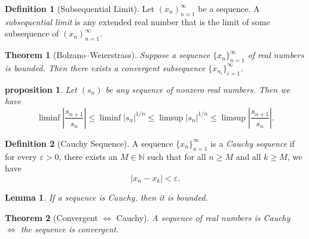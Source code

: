 \documentclass{article}
\newtheorem{theorem}{Theorem}[section]
\newtheorem{lemma}{Lemma}[section]
\newtheorem{proposition}{Proposition}[section]
\newtheorem{proposition}{proposition}[section]
\theoremstyle{definition}
\newtheorem{definition}{Definition}[section]
\theoremstyle{remark}
\begin{document}
\begin{definition}[Subsequential Limit]
Let  $ (x_n)^\infty_{n=1}$ be a sequence. A \textit{subsequential limit} is any extended real number that is the limit of some subsequence of  $ (x_n)^\infty_{n=1}$.

\end{definition}






\begin{theorem}[Bolzano–Weierstrass] \label{thm: Bolzano-Weierstrass}
Suppose a sequence \( \{x_n\}_{n=1}^{\infty} \) of real numbers is bounded. Then there exists a convergent subsequence \( \{x_{n_i}\}_{i=1}^{\infty} \).
\end{theorem}



\begin{proposition}
Let $(s_n)$ be any sequence of nonzero real numbers. Then we have
\[
\liminf \left| \frac{s_{n+1}}{s_n} \right| 
\leq \liminf |s_n|^{1/n} 
\leq \limsup |s_n|^{1/n} 
\leq \limsup \left| \frac{s_{n+1}}{s_n} \right|.
\]

\end{proposition}









\begin{definition}[Cauchy Sequence]\label{def:cauchy_sequence}
A sequence \( \{x_n\}_{n=1}^{\infty} \) is a \textit{Cauchy sequence} if for every \( \varepsilon > 0 \), there exists an \( M \in \mathbb{N} \) such that for all \( n \geq M \) and all \( k \geq M \), we have
\[
|x_n - x_k| < \varepsilon.
\]
\end{definition}







\begin{lemma}\label{lem:if cauchy then bounded}
If a sequence is Cauchy, then it is bounded. 
\end{lemma}







\begin{theorem}[Convergent $\iff$ Cauchy]\label{thm:cauchy_convergence}
A sequence of real numbers is Cauchy $ \iff$ the sequence is convergent. 

\end{theorem}
\end{document}
